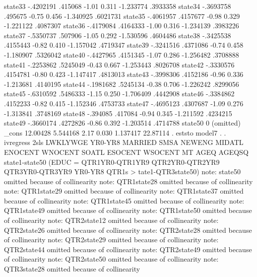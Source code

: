      state33 {\VBAR}  -.4202191    .415068    -1.01   0.311    -1.233774    .3933358
     state34 {\VBAR}  -.3693758    .495675    -0.75   0.456    -1.340925    .6021731
     state35 {\VBAR}  -.4061957   .4157677    -0.98   0.329    -1.221122    .4087307
     state36 {\VBAR}  -.4179084   .4164333    -1.00   0.316    -1.234139    .3983226
     state37 {\VBAR}  -.5350737    .507906    -1.05   0.292    -1.530596    .4604486
     state38 {\VBAR}  -.3425538   .4155443    -0.82   0.410    -1.157042    .4719347
     state39 {\VBAR}  -.3241516   .4371086    -0.74   0.458    -1.180907    .5326042
     state40 {\VBAR}  -.4427965   .4151345    -1.07   0.286    -1.256482    .3708888
     state41 {\VBAR}  -.2253862   .5245049    -0.43   0.667    -1.253443    .8026708
     state42 {\VBAR}  -.3330576   .4154781    -0.80   0.423    -1.147417    .4813013
     state43 {\VBAR}  -.3998306   .4152186    -0.96   0.336    -1.213681    .4140195
     state44 {\VBAR}  -.1981682   .5245134    -0.38   0.706    -1.226242    .8299056
     state45 {\VBAR}  -.6310592   .5486333    -1.15   0.250    -1.706409    .4442908
     state46 {\VBAR}  -.3384862   .4152233    -0.82   0.415    -1.152346    .4753733
     state47 {\VBAR}  -.4695123   .4307687    -1.09   0.276    -1.313841    .3748169
     state48 {\VBAR}   -.394085    .417084    -0.94   0.345    -1.211592    .4234215
     state49 {\VBAR}  -.3660174   .4272826    -0.86   0.392    -1.203514    .4714788
     state50 {\VBAR}          0  (omitted)
       _cons {\VBAR}   12.00428   5.544168     2.17   0.030     1.137417    22.87114
{\smallskip}
. eststo model7
{\smallskip}
. 
. ivregress 2sls LWKLYWGE YR0-YR8 MARRIED SMSA NEWENG MIDATL ENOCENT WNOCENT SOATL ESOCENT WSOCENT MT AGEQ AGEQSQ state1-state50 (EDUC = QTR1YR0-QTR1YR9 QTR2YR0-QTR2YR9 QTR3YR0-QTR3YR9 YR0-YR8 QTR1s
> tate1-QTR3state50)
note: state50 omitted because of collinearity
note: QTR1state28 omitted because of collinearity
note: QTR1state29 omitted because of collinearity
note: QTR1state37 omitted because of collinearity
note: QTR1state45 omitted because of collinearity
note: QTR1state49 omitted because of collinearity
note: QTR1state50 omitted because of collinearity
note: QTR2state12 omitted because of collinearity
note: QTR2state26 omitted because of collinearity
note: QTR2state28 omitted because of collinearity
note: QTR2state29 omitted because of collinearity
note: QTR2state44 omitted because of collinearity
note: QTR2state49 omitted because of collinearity
note: QTR2state50 omitted because of collinearity
note: QTR3state28 omitted because of collinearity
